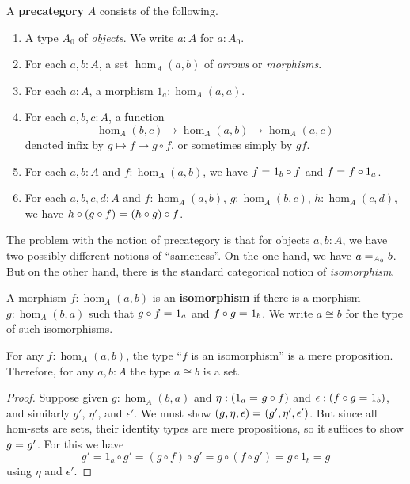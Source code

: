 \begin{defn}\label{ct:precategory}
  A \textbf{precategory} $A$ consists of the following.
  \begin{enumerate}
  \item A type $A_0$ of \emph{objects}.  We write $a:A$ for $a:A_0$.
  \item For each $a,b:A$, a set $\hom_A(a,b)$ of \emph{arrows} or \emph{morphisms}.
  \item For each $a:A$, a morphism $1_a:\hom_A(a,a)$.
  \item For each $a,b,c:A$, a function
    \[  \hom_A(b,c) \to \hom_A(a,b) \to \hom_A(a,c) \]
    denoted infix by $g\mapsto f\mapsto g\circ f$, or sometimes simply by $gf$.
  \item For each $a,b:A$ and $f:\hom_A(a,b)$, we have $\id f {1_b\circ f}$ and $\id f {f\circ 1_a}$.
  \item For each $a,b,c,d:A$ and $f:\hom_A(a,b)$, $g:\hom_A(b,c)$, $h:\hom_A(c,d)$, we have $\id {h\circ (g\circ f)}{(h\circ g)\circ f}$.
  \end{enumerate}
\end{defn}

The problem with the notion of precategory is that for objects $a,b:A$, we have two possibly-different notions of ``sameness''.
On the one hand, we have $\id[A_0]{a}{b}$.
But on the other hand, there is the standard categorical notion of \emph{isomorphism}.

\begin{defn}\label{ct:isomorphism}
  A morphism $f:\hom_A(a,b)$ is an \textbf{isomorphism} if there is a morphism $g:\hom_A(b,a)$ such that $\id{g\circ f}{1_a}$ and $\id{f\circ g}{1_b}$.
  We write $a\cong b$ for the type of such isomorphisms.
\end{defn}

\begin{lem}\label{ct:isoprop}
  For any $f:\hom_A(a,b)$, the type ``$f$ is an isomorphism'' is a mere proposition.
  Therefore, for any $a,b:A$ the type $a\cong b$ is a set.
\end{lem}
\begin{proof}
  Suppose given $g:\hom_A(b,a)$ and $\eta:(\id{1_a}{g\circ f})$ and $\epsilon:(\id{f\circ g}{1_b})$, and similarly $g'$, $\eta'$, and $\epsilon'$.
We must show $\id{(g,\eta,\epsilon)}{(g',\eta',\epsilon')}$.
  But since all hom-sets are sets, their identity types are mere propositions, so it suffices to show $\id g {g'}$.
  For this we have
  \[g' = 1_a\circ g' = (g\circ f)\circ g' = g\circ (f\circ g') = g\circ 1_b = g\]
  using $\eta$ and $\epsilon'$.
\end{proof}

